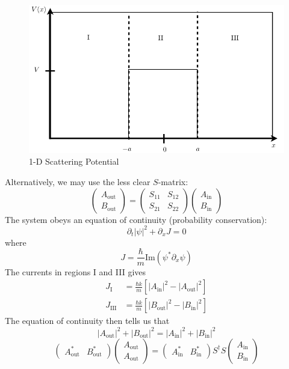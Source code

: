 \documentclass{article}
\begin{document}
\begin{figure}[h]
	\centering
	\includegraphics{Fig_1}
	\caption{1-D Scattering Potential}
\end{figure}
Alternatively, we may use the less clear $S$-matrix:
			$$\left(\begin{array}{c}A_{\mathrm{out}} \\B_{\mathrm{out}}\end{array}\right)=\left(\begin{array}{cc}S_{11} & S_{12} \\S_{21} & S_{22}\end{array}\right)\left(\begin{array}{c}A_{\mathrm{in}} \\B_{\mathrm{in}}\end{array}\right)$$
			The system obeys an equation of continuity (probability conservation):
			$$\partial_t\left|\psi\right|^2+\partial_xJ=0$$
			where
			$$J=\frac{\hbar}{m}\mathrm{Im}\left(\psi^*\partial_x\psi\right)$$
			The currents in regions I and III gives
			\begin{align*}
				J_{\mathrm{I}}&=\frac{\hbar k}{m}\left[\left|A_{\mathrm{in}}\right|^2-\left|A_{\mathrm{out}}\right|^2\right]\\
				J_{\mathrm{III}}&=\frac{\hbar k}{m}\left[\left|B_{\mathrm{out}}\right|^2-\left|B_{\mathrm{in}}\right|^2\right]
			\end{align*}
			The equation of continuity then tells us that
			$$\left|A_{\mathrm{out}}\right|^2+\left|B_{\mathrm{out}}\right|^2=\left|A_{\mathrm{in}}\right|^2+\left|B_{\mathrm{in}}\right|^2$$
			$$\left(\begin{array}{cc}A_{\mathrm{out}}^* & B_{\mathrm{out}}^*\end{array}\right)\left(\begin{array}{c}A_{\mathrm{out}} \\A_{\mathrm{out}}\end{array}\right)=\left(\begin{array}{cc}A_{\mathrm{in}}^* & B_{\mathrm{in}}^*\end{array}\right)S^\dagger S\left(\begin{array}{c}A_{\mathrm{in}} \\B_{\mathrm{in}}\end{array}\right)$$
\end{document}
